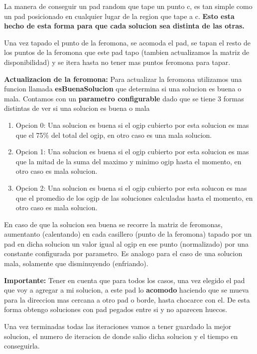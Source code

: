 La manera de conseguir un pad random que tape un punto c, es tan simple como un pad posicionado en cualquier lugar de la region que tape a c. \textbf{Esto esta hecho de esta forma para que cada solucion sea distinta de las otras.}

Una vez tapado el punto de la feromona, se acomoda el pad, se tapan el resto de los puntos de la feromona que este pad tapo (tambien actualizamos la matriz de disponibilidad) y se itera hasta no tener mas puntos feromona para tapar. 

\textbf{Actualizacion de la feromona:} Para actualizar la feromona utilizamos una funcion llamada \textbf{esBuenaSolucion} que determina si una solucion es buena o mala. Contamos con un \textbf{parametro configurable} dado que se tiene 3 formas distintas de ver si una solucion es buena o mala

\begin{enumerate}
\item Opcion 0: Una solucion es buena si el ogip cubierto por esta solucion es mas que el 75\% del total del ogip, en otro caso es una mala solucion.
\item Opcion 1: Una solucion es buena si el ogip cubierto por esta solucion es mas que la mitad de la suma del maximo y minimo ogip hasta el momento, en otro caso es mala solucion.
\item Opcion 2: Una solucion es buena si el ogip cubierto por esta solucon es mas que el promedio de los ogip de las soluciones calculadas hasta el momento, en otro caso es mala solucion. 
\end{enumerate}

En caso de que la solucion sea buena se recorre la matriz de feromonas, aumentanto (calentando) en cada casillero (punto de la feromona) tapado por un pad en dicha solucion un valor igual al ogip en ese punto (normalizado) por una constante configurada por parametro. Es analogo para el caso de una solucion mala, solamente que disminuyendo (enfriando).


\textbf{Importante:} Tener en cuenta que para todos los casos, una vez elegido el pad que voy a agregar a mi solucion, a este pad lo \textbf{acomodo} haciendo que se mueva para la direccion mas cercana a otro pad o borde, hasta chocarce con el. De esta forma obtengo soluciones con pad pegados entre si y no aparecen huecos.

Una vez terminadas todas las iteraciones vamos a tener guardado la mejor solucion, el numero de iteracion de donde salio dicha solucion y el tiempo en conseguirla.


